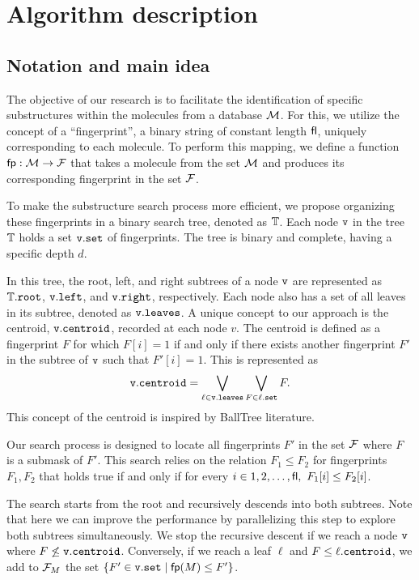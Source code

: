 \section{Algorithm description}

\subsection{Notation and main idea}
The objective of our research is to facilitate the identification of specific substructures within the molecules from a database $\mathcal{M}$. For this, we utilize the concept of a ``fingerprint'', a binary string of constant length ${\sf fl}$, uniquely corresponding to each molecule. To perform this mapping, we define a function ${\sf fp}: \mathcal{M} \to \mathcal{F}$ that takes a molecule from the set $\mathcal{M}$ and produces its corresponding fingerprint in the set $\mathcal{F}$.

To make the substructure search process more efficient, we propose organizing these fingerprints in a binary search tree, denoted as $\mathbb{T}$. Each node $\tt{v}$ in the tree $\mathbb{T}$ holds a set $\tt{v.set}$ of fingerprints. The tree is binary and complete, having a specific depth $d$.

In this tree, the root, left, and right subtrees of a node $\tt{v}$ are represented as $\mathbb{T}.\tt{root}$, $\tt{v.left}$, and $\tt{v.right}$, respectively. Each node also has a set of all leaves in its subtree, denoted as $\tt{v.leaves}$. A unique concept to our approach is the centroid, ${\tt v.centroid}$, recorded at each node $v$. The centroid is defined as a fingerprint $F$ for which $F[i] = 1$ if and only if there exists another fingerprint $F'$ in the subtree of $\tt{v}$ such that $F'[i] = 1$. This is represented as
$${\tt v.centroid} = \bigvee\limits_{\ell \in {\tt v.leaves}}\bigvee\limits_{F \in \ell.{\tt set}} F.$$ 
This concept of the centroid is inspired by BallTree literature.

Our search process is designed to locate all fingerprints $F'$ in the set $\mathcal{F}$ where $F$ is a submask of $F'$. This search relies on the relation $F_1 \le F_2$ for fingerprints $F_1, F_2$ that holds true if and only if for every $i \in {1, 2, \ldots, {\sf fl}}, \ F_1[i] \le F_2[i]$. 

The search starts from the root and recursively descends into both subtrees. Note that here we can improve the performance by parallelizing this step to explore both subtrees simultaneously. We stop the recursive descent if we reach a node ${\tt v}$ where $F \not\le {\tt v.centroid}$. Conversely, if we reach a leaf $\ell$ and $F \le \ell.{\tt centroid}$, we add to $\mathcal{F}_M$ the set $\{F' \in {\tt v.set} \mid {\sf fp}(M) \le F'\}$.

